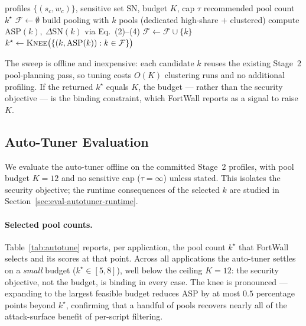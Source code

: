 \begin{algorithm}[t]
\caption{Auto-tuning the pool count $k$}
\label{alg:autotune}
\begin{algorithmic}[1]
\Require profiles $\{(s_c,w_c)\}$, sensitive set $\mathrm{SN}$, budget $K$, cap $\tau$
\Ensure recommended pool count $k^\star$
\State $\mathcal{F}\gets\emptyset$
  \State build pooling with $k$ pools (dedicated high-share $+$ clustered)
  \State compute $\mathrm{ASP}(k),\ \Delta\mathrm{SN}(k)$ via Eq.~(2)--(4)
     \State $\mathcal{F}\gets\mathcal{F}\cup\{k\}$
  \EndIf
\EndFor
\State \Return $k^\star \gets \textsc{Knee}\big(\{(k,\mathrm{ASP}(k)):k\in\mathcal{F}\}\big)$
\end{algorithmic}
\end{algorithm}

The sweep is offline and inexpensive: each candidate $k$ reuses the existing
Stage~2 pool-planning pass, so tuning costs $O(K)$ clustering runs and no
additional profiling. If the returned $k^\star$ equals $K$, the budget --- rather
than the security objective --- is the binding constraint, which FortWall reports
as a signal to raise $K$.

\subsection{Auto-Tuner Evaluation}
\label{sec:eval-autotuner}

We evaluate the auto-tuner offline on the committed Stage~2 profiles, with pool
budget $K=12$ and no sensitive cap ($\tau=\infty$) unless stated. This isolates
the security objective; the runtime consequences of the selected $k$ are studied
in Section~\ref{sec:eval-autotuner-runtime}.

\paragraph{Selected pool counts.}
Table~\ref{tab:autotune} reports, per application, the pool count $k^\star$ that
FortWall selects and its scores at that point. Across all applications the
auto-tuner settles on a \emph{small} budget ($k^\star\in[5,8]$), well below the
ceiling $K=12$: the security objective, not the budget, is binding in every case.
The knee is pronounced --- expanding to the largest feasible budget reduces ASP
by at most $0.5$ percentage points beyond $k^\star$, confirming that a handful of
pools recovers nearly all of the attack-surface benefit of per-script filtering.

